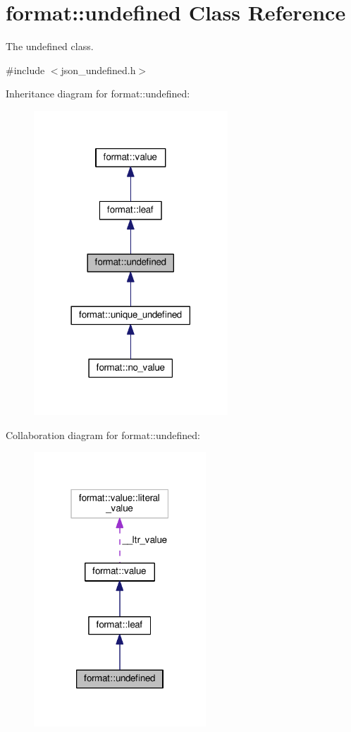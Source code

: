 \hypertarget{classformat_1_1undefined}{}\section{format\+:\+:undefined Class Reference}
\label{classformat_1_1undefined}


The undefined class.  




{\ttfamily \#include $<$json\+\_\+undefined.\+h$>$}



Inheritance diagram for format\+:\+:undefined\+:
\nopagebreak
\begin{figure}[H]
\begin{center}
\leavevmode
\includegraphics[width=206pt]{classformat_1_1undefined__inherit__graph}
\end{center}
\end{figure}


Collaboration diagram for format\+:\+:undefined\+:
\nopagebreak
\begin{figure}[H]
\begin{center}
\leavevmode
\includegraphics[width=183pt]{classformat_1_1undefined__coll__graph}
\end{center}
\end{figure}
